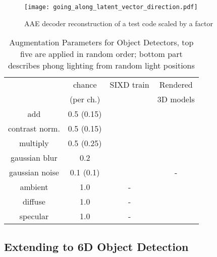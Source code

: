 \begin{figure}[t]\centering
		\captionsetup{width=0.99\columnwidth}
		\texttt{[image: going\_along\_latent\_vector\_direction.pdf]}
		\caption{\gls{AAE} decoder reconstruction of a test code  scaled by a factor }
		\label{fig:scale}
\end{figure}
\begin{table}[t]
	\scriptsize
	\centering
	\captionsetup{width=0.9\columnwidth}
	\caption{Augmentation Parameters for Object Detectors, top five are applied in random order; bottom part describes phong lighting from random light positions}
	\begin{tabular}{cc|cc}
		\toprule
		&chance & SIXD train & Rendered \\
		&(per ch.)& & 3D models \\
		\midrule
		add & 0.5 (0.15) &   & \\
		contrast norm. &0.5 (0.15)&   &\\
		multiply & 0.5 (0.25) &  & \\
		gaussian blur & 0.2 &   &  \\
		gaussian noise & 0.1 (0.1) &  & - \\
		\midrule
		ambient & 1.0 & -& \\
		diffuse &1.0&-& \\
		specular &1.0&-& 
	\end{tabular}
	\label{tab:aug_det}
\end{table}
\subsection{Extending to 6D Object Detection}
